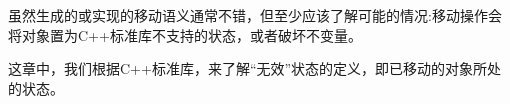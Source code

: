 虽然生成的或实现的移动语义通常不错，但至少应该了解可能的情况:移动操作会将对象置为C++标准库不支持的状态，或者破坏不变量。

这章中，我们根据C++标准库，来了解“无效”状态的定义，即已移动的对象所处的状态。